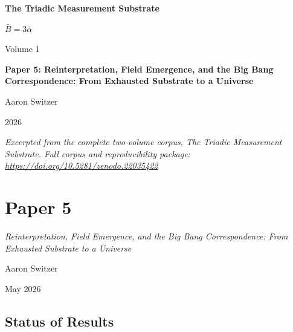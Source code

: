 \documentclass[11pt,oneside]{report}
\theoremstyle{definition}
\theoremstyle{remark}
\begin{document}
\thispagestyle{empty}
\begin{titlepage}
\centering
\vspace*{2cm}
{\sffamily\bfseries\Large The Triadic Measurement Substrate\par}
\vspace{0.6cm}
{\large $\bar{B} = 3\bar{\alpha}$\par}
\vspace{1cm}
{\sffamily\large Volume 1\par}
\vspace{1.4cm}
{\Large \bfseries Paper 5: Reinterpretation, Field Emergence, and the Big Bang Correspondence: From Exhausted Substrate to a Universe\par}
\vfill
{\large Aaron Switzer\par}
\vspace{0.4cm}
{\large 2026\par}
\vspace{1.2cm}
{\small\itshape Excerpted from the complete two-volume corpus, \emph{The Triadic Measurement Substrate}. Full corpus and reproducibility package: \url{https://doi.org/10.5281/zenodo.22035422}\par}
\end{titlepage}
\cleardoublepage
{}

\chapter*{Paper 5}
\begingroup\centering
{\large\itshape Reinterpretation, Field Emergence, and the Big Bang Correspondence: From Exhausted Substrate to a Universe\par}\vspace{0.8em}
{\normalsize Aaron Switzer\par}
{\small May 2026\par}
\endgroup\vspace{1.0em}

\par\vspace{0.6em}

\section*{Status of Results}
\end{document}
